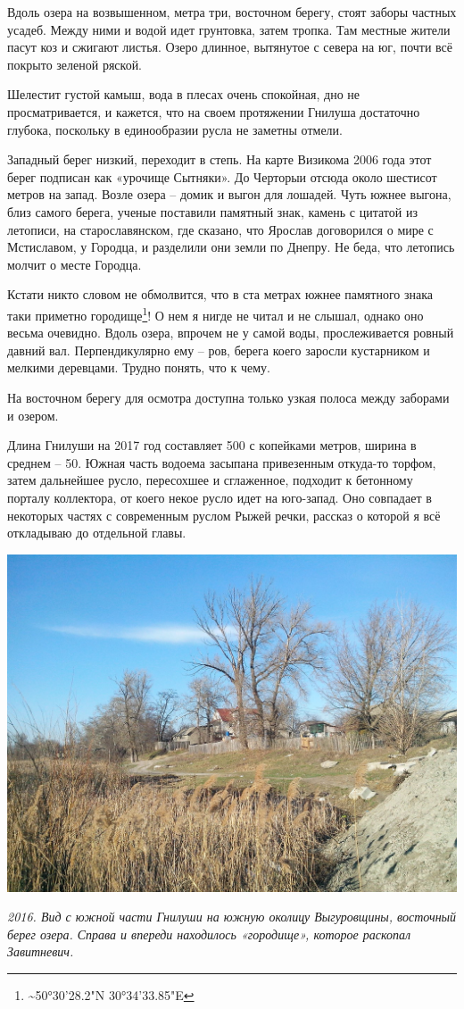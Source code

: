 Вдоль озера на возвышенном, метра три, восточном берегу, стоят заборы частных усадеб. Между ними и водой идет грунтовка, затем тропка. Там местные жители пасут коз и сжигают листья. Озеро длинное, вытянутое с севера на юг, почти всё покрыто зеленой ряской.

Шелестит густой камыш, вода в плесах очень спокойная, дно не просматривается, и кажется, что на своем протяжении Гнилуша достаточно глубока, поскольку в единообразии русла не заметны отмели.

Западный берег низкий, переходит в степь. На карте Визикома 2006 года этот берег подписан как «урочище Сытняки». До Черторыи отсюда около шестисот метров на запад. Возле озера – домик и выгон для лошадей. Чуть южнее выгона, близ самого берега, ученые поставили памятный знак, камень с цитатой из летописи, на старославянском, где сказано, что Ярослав договорился о мире с Мстиславом, у Городца, и разделили они земли по Днепру. Не беда, что летопись молчит о месте Городца.

Кстати никто словом не обмолвится, что в ста метрах южнее памятного знака таки приметно городище\footnote{\textasciitilde{}50°30'28.2"N 30°34'33.85"E}! О нем я нигде не читал и не слышал, однако оно весьма очевидно. Вдоль озера, впрочем не у самой воды, прослеживается ровный давний вал. Перпендикулярно ему – ров, берега коего заросли кустарником и мелкими деревцами. Трудно понять, что к чему.

На восточном берегу для осмотра доступна только узкая полоса между заборами и озером. 

Длина Гнилуши на 2017 год составляет 500 с копейками метров, ширина в среднем – 50. Южная часть водоема засыпана привезенным откуда-то торфом, затем дальнейшее русло, пересохшее и сглаженное, подходит к бетонному порталу коллектора, от коего некое русло идет на юго-запад. Оно совпадает в некоторых частях с современным руслом Рыжей речки, рассказ о которой я всё откладываю до отдельной главы.

\newpage
\begin{center}
\includegraphics[width=0.93\linewidth]{chast-gorodki/gnilusha/IMG_20160316_154028.jpg}

\textit{2016. Вид с южной части Гнилуши на южную околицу Выгуровщины, восточный берег озера. Справа и впереди находилось «городище», которое раскопал Завитневич.}
\end{center}

